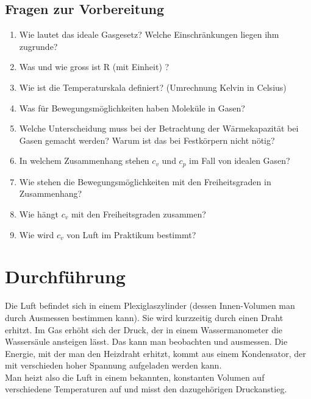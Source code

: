 \begin{tutorhint}
\section{Fragen zur Vorbereitung}

\begin{enumerate}
 \item Wie lautet das ideale Gasgesetz? Welche Einschränkungen liegen ihm zugrunde?
 \item Was und wie gross ist R (mit Einheit) ?
 \item Wie ist die Temperaturskala definiert? (Umrechnung Kelvin in Celsius)
 \item Was für Bewegungsmöglichkeiten haben Moleküle in Gasen?
 \item Welche Unterscheidung muss bei der Betrachtung der Wärmekapazität bei Gasen gemacht werden? Warum ist das bei Festkörpern nicht nötig?
 \item In welchem Zusammenhang stehen $c_v$ und $c_p$ im Fall von idealen Gasen?
 \item Wie stehen die Bewegungsmöglichkeiten mit den Freiheitsgraden in Zusammenhang?
 \item Wie hängt $c_v$ mit den Freiheitsgraden zusammen?
 \item Wie wird $c_v$ von Luft im Praktikum bestimmt?
\end{enumerate}
\end{tutorhint}

\section{Durchführung} 

Die Luft befindet sich in einem Plexiglaszylinder (dessen Innen-Volumen man durch Ausmessen bestimmen kann). Sie wird kurzzeitig durch einen Draht erhitzt. Im Gas erhöht sich der Druck, der in einem Wassermanometer die Wassersäule ansteigen lässt. Das kann man beobachten und ausmessen. Die Energie, mit der man den Heizdraht erhitzt, kommt aus einem Kondensator, der mit verschieden hoher Spannung aufgeladen werden kann.\\
Man heizt also die Luft in einem bekannten, konstanten Volumen auf verschiedene Temperaturen auf und misst den dazugehörigen Druckanstieg.\\

